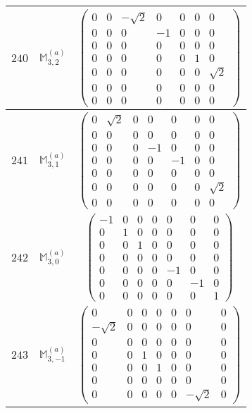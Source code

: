 \documentclass[fleqn,8pt,landscape]{jsarticle}
\begin{document}
\begin{center}
\begin{longtable}{ccc}
$ 240 $ & $ \mathbb{M}_{3,2}^{(a)} $ & $ \begin{pmatrix} 0 & 0 & - \sqrt{2} & 0 & 0 & 0 & 0 \\ 0 & 0 & 0 & -1 & 0 & 0 & 0 \\ 0 & 0 & 0 & 0 & 0 & 0 & 0 \\ 0 & 0 & 0 & 0 & 0 & 1 & 0 \\ 0 & 0 & 0 & 0 & 0 & 0 & \sqrt{2} \\ 0 & 0 & 0 & 0 & 0 & 0 & 0 \\ 0 & 0 & 0 & 0 & 0 & 0 & 0 \end{pmatrix} $ \\ \hline
$ 241 $ & $ \mathbb{M}_{3,1}^{(a)} $ & $ \begin{pmatrix} 0 & \sqrt{2} & 0 & 0 & 0 & 0 & 0 \\ 0 & 0 & 0 & 0 & 0 & 0 & 0 \\ 0 & 0 & 0 & -1 & 0 & 0 & 0 \\ 0 & 0 & 0 & 0 & -1 & 0 & 0 \\ 0 & 0 & 0 & 0 & 0 & 0 & 0 \\ 0 & 0 & 0 & 0 & 0 & 0 & \sqrt{2} \\ 0 & 0 & 0 & 0 & 0 & 0 & 0 \end{pmatrix} $ \\ \hline
$ 242 $ & $ \mathbb{M}_{3,0}^{(a)} $ & $ \begin{pmatrix} -1 & 0 & 0 & 0 & 0 & 0 & 0 \\ 0 & 1 & 0 & 0 & 0 & 0 & 0 \\ 0 & 0 & 1 & 0 & 0 & 0 & 0 \\ 0 & 0 & 0 & 0 & 0 & 0 & 0 \\ 0 & 0 & 0 & 0 & -1 & 0 & 0 \\ 0 & 0 & 0 & 0 & 0 & -1 & 0 \\ 0 & 0 & 0 & 0 & 0 & 0 & 1 \end{pmatrix} $ \\ \hline
$ 243 $ & $ \mathbb{M}_{3,-1}^{(a)} $ & $ \begin{pmatrix} 0 & 0 & 0 & 0 & 0 & 0 & 0 \\ - \sqrt{2} & 0 & 0 & 0 & 0 & 0 & 0 \\ 0 & 0 & 0 & 0 & 0 & 0 & 0 \\ 0 & 0 & 1 & 0 & 0 & 0 & 0 \\ 0 & 0 & 0 & 1 & 0 & 0 & 0 \\ 0 & 0 & 0 & 0 & 0 & 0 & 0 \\ 0 & 0 & 0 & 0 & 0 & - \sqrt{2} & 0 \end{pmatrix} $ \\ \hline

\end{longtable}
\end{center}
\end{document}
